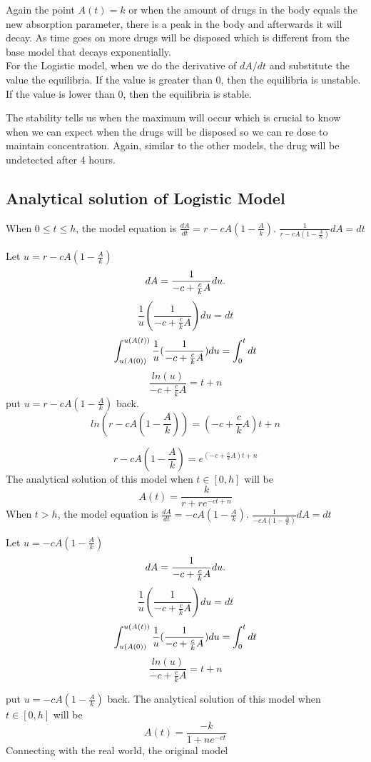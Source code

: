 \documentclass{article}
\begin{document}
Again the point $A(t) = k$ or when the amount of drugs in the body equals the new absorption parameter, there is a peak in the body and afterwards it will decay. As time goes on more drugs will be disposed which is different from the base model that decays exponentially.\\

For the Logistic model, when we do the derivative of $dA/dt$ and substitute the value the equilibria. If the value is greater than 0, then the equilibria is unstable. If the value is lower than 0, then the equilibria is stable.

The stability tells us when the maximum will occur which is crucial to know when we can expect when the drugs will be disposed so we can re dose to maintain concentration. Again, similar to the other models, the drug will be undetected after 4 hours. 



\subsection*{Analytical solution of Logistic Model}
When $0 \leq t \leq h$, the model equation is  $\frac{dA}{dt} =r-cA(1-\frac{A}{k})$.
$\frac{1}{r-cA(1-\frac{A}{k})}dA = dt$

Let $u = r-cA(1-\frac{A}{k})$\\
$$
dA = \frac{1}{-c+\frac{c}{k}A}du.\\
$$
$$
\frac{1}{u}( \frac{1}{-c+\frac{c}{k}A})du = dt
$$
$$
\int_{u(A(0))}^{u(A(t))} \frac{1}{u}( \frac{1}{-c+\frac{c}{k}A})du = \int_{0}^{t} dt\\
$$
$$
\frac{ln (u)}{-c+\frac{c}{k}A} = t + n
$$
put $u = r-cA(1-\frac{A}{k})$ back.
$$
ln(r-cA(1-\frac{A}{k})) = (-c+\frac{c}{k}A)t + n
$$

$$
r-cA(1-\frac{A}{k}) = e^{(-c+\frac{c}{k}A)t + n}
$$
The analytical solution of this model when $t \in [0,h]$ will be
$$
A(t) = \frac{k}{r + re^{-ct+n}}
$$
When $ t > h$, the model equation is  $\frac{dA}{dt} =-cA(1-\frac{A}{k})$.
$\frac{1}{-cA(1-\frac{A}{k})}dA = dt$

Let $u = -cA(1-\frac{A}{k})$\\
$$
dA = \frac{1}{-c+\frac{c}{k}A}du.\\
$$
$$
\frac{1}{u}( \frac{1}{-c+\frac{c}{k}A})du = dt
$$
$$
\int_{u(A(0))}^{u(A(t))} \frac{1}{u}( \frac{1}{-c+\frac{c}{k}A})du = \int_{0}^{t} dt\\
$$
$$
\frac{ln (u)}{-c+\frac{c}{k}A} = t + n
$$

put $u = -cA(1-\frac{A}{k})$ back.
The analytical solution of this model when $t \in [0,h]$ will be
$$
A(t) = \frac{-k}{1+ne^{-ct}}
$$
Connecting with the real world, the original model
\end{document}
